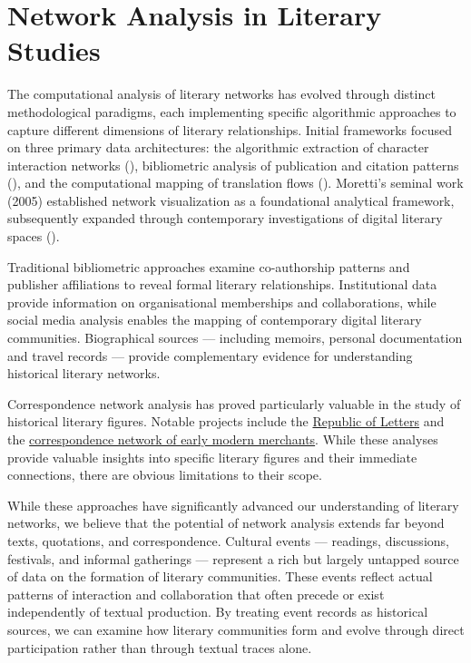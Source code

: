 \documentclass{jcls}
\begin{document}
\section{Network Analysis in Literary Studies}

The computational analysis of literary networks has evolved through distinct methodological paradigms, each implementing specific algorithmic approaches to capture different dimensions of literary relationships. Initial frameworks focused on three primary data architectures: the algorithmic extraction of character interaction networks (\cite{elson}), bibliometric analysis of publication and citation patterns (\cite{so}), and the computational mapping of translation flows (\cite{folica}). Moretti's seminal work (2005) established network visualization as a foundational analytical framework, subsequently expanded through contemporary investigations of digital literary spaces (\cite{basnet}).

Traditional bibliometric approaches examine co-authorship patterns and publisher affiliations to reveal formal literary relationships. Institutional data provide information on organisational memberships and collaborations, while social media analysis enables the mapping of contemporary digital literary communities. Biographical sources — including memoirs, personal documentation and travel records — provide complementary evidence for understanding historical literary networks.

Correspondence network analysis has proved particularly valuable in the study of historical literary figures. Notable projects include the \href{http://republicofletters.stanford.edu/}{Republic of Letters} and the \href{https://www.jessesadler.com/project/dvdm-correspondence}{correspondence network of early modern merchants}. While these analyses provide valuable insights into specific literary figures and their immediate connections, there are obvious limitations to their scope.

While these approaches have significantly advanced our understanding of literary networks, we believe that the potential of network analysis extends far beyond texts, quotations, and correspondence. Cultural events — readings, discussions, festivals, and informal gatherings — represent a rich but largely untapped source of data on the formation of literary communities. These events reflect actual patterns of interaction and collaboration that often precede or exist independently of textual production. By treating event records as historical sources, we can examine how literary communities form and evolve through direct participation rather than through textual traces alone.
\end{document}
